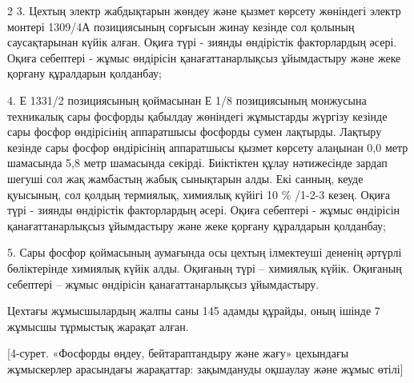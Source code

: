 \begin{multicols}{2}
3. Цехтың электр жабдықтарын жөндеу және қызмет көрсету жөніндегі электр
монтері 1309/4А позициясының сорғысын жинау кезінде сол қолының
саусақтарынан күйік алған. Оқиға түрі - зиянды өндірістік факторлардың
әсері. Оқиға себептері - жұмыс өндірісін қанағаттанарлықсыз ұйымдастыру
және жеке қорғану құралдарын қолданбау;

4. Е 1331/2 позициясының қоймасынан Е 1/8 позициясының монжусына
техникалық сары фосфорды қабылдау жөніндегі жұмыстарды жүргізу кезінде
сары фосфор өндірісінің аппаратшысы фосфорды сумен лақтырды. Лақтыру
кезінде сары фосфор өндірісінің аппаратшысы қызмет көрсету алаңынан 0,0
метр шамасында 5,8 метр шамасында секірді. Биіктіктен құлау нәтижесінде
зардап шегуші сол жақ жамбастың жабық сынықтарын алды. Екі санның, кеуде
қуысының, сол қолдың термиялық, химиялық күйігі 10 \% /1-2-3 кезең.
Оқиға түрі - зиянды өндірістік факторлардың әсері. Оқиға себептері -
жұмыс өндірісін қанағаттанарлықсыз ұйымдастыру және жеке қорғану
құралдарын қолданбау;

5. Сары фосфор қоймасының аумағында осы цехтың ілмектеуші дененің
әртүрлі бөліктерінде химиялық күйік алды. Оқиғаның түрі -- химиялық
күйік. Оқиғаның себептері -- жұмыс өндірісін қанағаттанарлықсыз
ұйымдастыру.

Цехтағы жұмысшылардың жалпы саны 145 адамды құрайды, оның ішінде 7
жұмысшы тұрмыстық жарақат алған.
\end{multicols}

[4-сурет. «Фосфорды өңдеу,
бейтараптандыру және жағу» цехындағы жұмыскерлер арасындағы
жарақаттар: зақымдануды оқшаулау және жұмыс өтілі]

